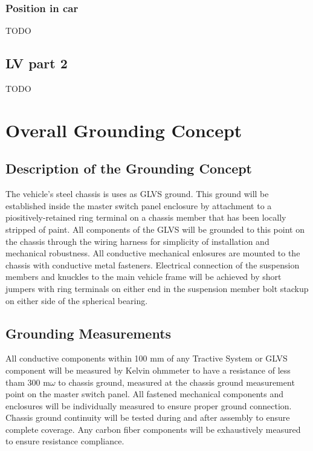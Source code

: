 \documentclass{article}
\begin{document}
\subsubsection{Position in car}
TODO

\subsection{LV part 2}
TODO

\section{Overall Grounding Concept}\label{overall_grounding_concept}
\subsection{Description of the Grounding Concept}
The vehicle's steel chassis is uses as GLVS ground. This ground will be established inside the master switch panel enclosure by attachment to a piositively-retained ring terminal on a chassis member that has been locally stripped of paint. All components of the GLVS will be grounded to this point on the chassis through the wiring harness for simplicity of installation and mechanical robustness. All conductive mechanical enlosures are mounted to the chassis with conductive metal fasteners. Electrical connection of the suspension members and knuckles to the main vehicle frame will be achieved by short jumpers with ring terminals on either end in the suspension member bolt stackup on either side of the spherical bearing.


\subsection{Grounding Measurements}
All conductive components within 100 mm of any Tractive System or GLVS component will be measured by Kelvin ohmmeter to have a resistance of less tham 300 m$\omega$ to chassis ground, measured at the chassis ground measurement point on the master switch panel. All fastened mechanical components and enclosures will be individually measured to ensure proper ground connection. Chassis ground continuity will be tested during and after assembly to ensure complete coverage. Any carbon fiber components will be exhaustively measured to ensure resistance compliance.
\end{document}
